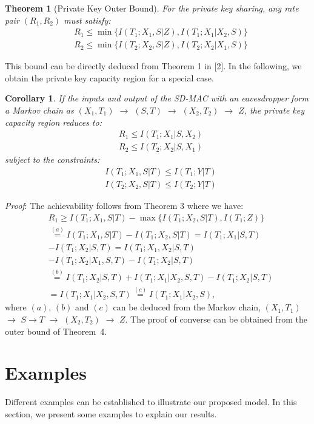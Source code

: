 \documentclass[conference,8pt]{IEEEtran}
\newtheorem{th1}{Theorem}
\newtheorem{corollary}{Corollary}
\begin{document}
{{{{\begin{th1}[Private Key Outer Bound]
For the private key sharing, any rate pair $(R_1,R_2)$ must satisfy:
\begin{align}
&R_1\leq \min \{I(T_1;X_1,S|Z),I(T_1;X_1|X_2,S)\} \\
&R_2\leq \min \{I(T_2;X_2,S|Z),I(T_2;X_2|X_1,S)\} 
\end{align}
\end{th1}
This bound can be directly deduced from Theorem 1 in [2].
In the following, we obtain the private key capacity region for a special case.
\begin{corollary}
If the inputs and output of the SD-MAC with an eavesdropper form a Markov chain as $(X_1,T_1)$ $\rightarrow$ $(S,T)$ $\rightarrow$ $(X_2,T_2)$ $\rightarrow$ $Z$, the private key capacity region reduces to:
\begin{align}
& R_1 \leq I(T_1;X_1|S,X_2) \\
& R_2 \leq I(T_2;X_2|S,X_1)
\end{align}
subject to the constraints:
\begin{align}
&I(T_1;X_1,S|T) \leq I(T_1;Y|T) \\
&I(T_2;X_2,S|T) \leq I(T_2;Y|T)
\end{align}
\end{corollary}
\emph{Proof}: The achievability follows from Theorem 3 where we have:
\begin{align}
&R_1 \geq I(T_1;X_1,S|T)-\max \{ I(T_1;X_2,S|T),I(T_1;Z) \}  \nonumber \\
&\stackrel{(a)}{=} I(T_1;X_1,S|T)-I(T_1;X_2,S|T)=I(T_1;X_1|S,T) \nonumber \\
&-I(T_1;X_2|S,T)=I(T_1;X_1,X_2|S,T)\nonumber \\
&-I(T_1;X_2|X_1,S,T)-I(T_1;X_2|S,T) \nonumber \\
&\stackrel{(b)}{=} I(T_1;X_2|S,T)+I(T_1;X_1|X_2,S,T)-I(T_1;X_2|S,T)\nonumber \\
&=I(T_1;X_1|X_2,S,T) \stackrel{(c)}{=} I(T_1;X_1|X_2,S), 
\end{align}
where $(a)$, $(b)$ and $(c)$ can be deduced from the Markov chain, $(X_1,T_1)$ $\rightarrow$ $S \rightarrow T$ $\rightarrow$ $(X_2,T_2)$ $\rightarrow$ $Z$. The proof of converse can be obtained from the outer bound of Theorem~4.
}
}
\section{Examples} 
Different examples can be established to illustrate our proposed model. In this section, we present some examples to explain our results.

}}
\end{document}
